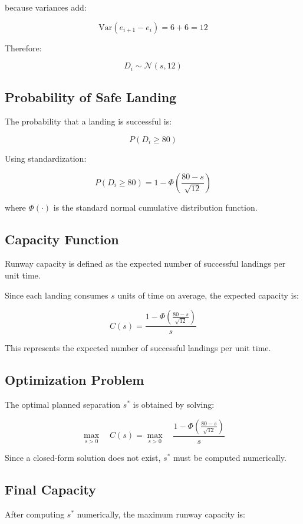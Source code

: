 \documentclass{KPS_assignment}
\begin{document}
because variances add:

\[
\text{Var}(e_{i+1} - e_i) = 6 + 6 = 12
\]

Therefore:

\[
D_i \sim \mathcal{N}(s,12)
\]

\subsection*{Probability of Safe Landing}

The probability that a landing is successful is:

\[
P(D_i \ge 80)
\]

Using standardization:

\[
P(D_i \ge 80)
=
1 -
\Phi\left(
\frac{80 - s}{\sqrt{12}}
\right)
\]

where $\Phi(\cdot)$ is the standard normal cumulative distribution function.

\subsection*{Capacity Function}

Runway capacity is defined as the expected number of successful landings per unit time.

Since each landing consumes $s$ units of time on average, the expected capacity is:

\[
C(s)
=
\frac{
1 -
\Phi\left(
\frac{80 - s}{\sqrt{12}}
\right)
}{s}
\]

This represents the expected number of successful landings per unit time.

\subsection*{Optimization Problem}

The optimal planned separation $s^*$ is obtained by solving:

\[
\max_{s > 0}
\quad
C(s)
=
\max_{s > 0}
\quad
\frac{
1 -
\Phi\left(
\frac{80 - s}{\sqrt{12}}
\right)
}{s}
\]

Since a closed-form solution does not exist, $s^*$ must be computed numerically.

\subsection*{Final Capacity}

After computing $s^*$ numerically, the maximum runway capacity is:
\end{document}
